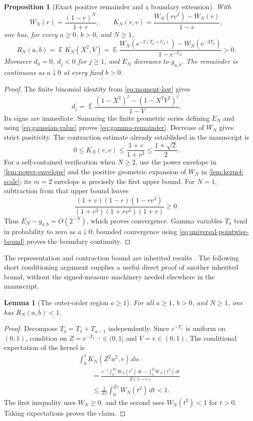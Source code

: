 \documentclass[11pt]{article}
\numberwithin{equation}{section}
\newtheorem{lemma}[theorem]{Lemma}
\newtheorem{proposition}[theorem]{Proposition}
\theoremstyle{definition}
\theoremstyle{remark}
\DeclareMathOperator{\E}{\mathbb E}
\begin{document}
\begin{proposition}[Exact positive remainder and a boundary extension]
\label{prop:gamma-remainder}
With
\[
 W_N(r)=\frac{(1-r)^N}{1+r},\qquad
 K_N(r,v)=\frac{W_N(rv^2)-W_N(r)}{1-v},
\]
one has, for every $a\geq0$, $b>0$, and $N\geq1$,
\begin{equation}\label{eq:gamma-remainder}
 R_N(a,b)=\E K_N(X^2,V)
 =\E\frac{W_N(e^{-2(T_a+U_b)})-W_N(e^{-2T_a})}
             {1-e^{-U_b}}>0.
\end{equation}
Moreover $d_0=0$, $d_j<0$ for $j\geq1$, and $E_N$ decreases to
$g_{a,b}$. The remainder is continuous as $a\downarrow0$ at every
fixed $b>0$.
\end{proposition}
\begin{proof}
The finite binomial identity from \eqref{eq:moment-law} gives
\[
 d_j=\E\frac{(1-X^2)^j-(1-X^2V^2)^j}{1-V}.
\]
Its signs are immediate. Summing the finite geometric series defining
$E_N$ and using \eqref{eq:gaussian-value} proves
\eqref{eq:gamma-remainder}. Decrease of $W_N$ gives strict positivity.
The contraction estimate already established in the manuscript is
\begin{equation}\label{eq:universal-pointwise-bound}
 0\leq K_N(r,v)\leq\frac{1+v}{1+v^2}
       \leq\frac{1+\sqrt2}{2}.
\end{equation}
For a self-contained verification when $N\geq2$, use the power envelope
in \cref{lem:power-envelope} and the positive geometric expansion of
$W_N$ in \cref{lem:kernel-scale}; its $m=2$ envelope is precisely the
first upper bound. For $N=1$, subtraction from that upper bound leaves
\[
 \frac{(1+v)(1-r)(1-rv^2)}
       {(1+v^2)(1+rv^2)(1+r)}\geq0.
\]
Thus $E_N-g_{a,b}=O(2^{-N})$, which proves convergence. Gamma
variables $T_a$ tend in probability to zero as $a\downarrow0$; bounded
convergence using \eqref{eq:universal-pointwise-bound} proves the
boundary continuity.
\end{proof}

The representation and contraction bound are inherited results
\cite{ProveItSnapshot,SharpEulerIncoming}. The following short
conditioning argument supplies a useful direct proof of another
inherited bound, without the signed-measure machinery needed elsewhere
in the manuscript.

\begin{lemma}[The outer-order region $a\geq1$]
\label{lem:outer-order-one}
For all $a\geq1$, $b>0$, and $N\geq1$, one has $R_N(a,b)<1$.
\end{lemma}
\begin{proof}
Decompose $T_a=T_1+T_{a-1}$ independently. Since $e^{-T_1}$ is
uniform on $(0,1)$, condition on $Z=e^{-T_{a-1}}\in(0,1]$ and
$V=v\in(0,1)$. The conditional expectation of the kernel is
\begin{align*}
 &\int_0^1 K_N(Z^2u^2,v)\,du\\
 &\qquad=\frac{v^{-1}\int_0^{Zv}W_N(t^2)\,dt
                         -\int_0^Z W_N(t^2)\,dt}{Z(1-v)}\\
 &\qquad\leq\frac1{Zv}\int_0^{Zv}W_N(t^2)\,dt<1.
\end{align*}
The first inequality uses $W_N\geq0$, and the second uses
$W_N(t^2)<1$ for $t>0$. Taking expectations proves the claim.
\end{proof}
\end{document}
